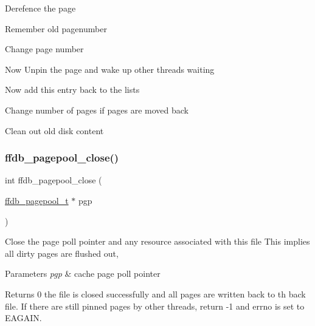 Derefence the page

Remember old pagenumber

Change page number

Now Unpin the page and wake up other threads waiting

Now add this entry back to the lists

Change number of pages if pages are moved back

Clean out old disk content\mbox{\label{adat-devel_2other__libs_2filedb_2filehash_2ffdb__pagepool_8c_a73c44ef71020216252a28a384316dd93}} 
\subsubsection{\texorpdfstring{ffdb\_pagepool\_close()}{ffdb\_pagepool\_close()}}
{\footnotesize\ttfamily int ffdb\+\_\+pagepool\+\_\+close (\begin{DoxyParamCaption}\item[{\mbox{\hyperlink{adat-devel_2other__libs_2filedb_2filehash_2ffdb__pagepool_8h_a73290f737b0e5f8be90a0fa96ddf6ab6}{ffdb\+\_\+pagepool\+\_\+t}} $\ast$}]{pgp }\end{DoxyParamCaption})}

Close the page poll pointer and any resource associated with this file This implies all dirty pages are flushed out,


\begin{DoxyParams}{Parameters}
{\em pgp} & cache page poll pointer \\
\hline
\end{DoxyParams}
\begin{DoxyReturn}{Returns}
0 the file is closed successfully and all pages are written back to th back file. If there are still pinned pages by other threads, return -\/1 and errno is set to E\+A\+G\+A\+IN. 
\end{DoxyReturn}
\mbox{\label{adat-devel_2other__libs_2filedb_2filehash_2ffdb__pagepool_8c_a07a68c49feb01ff2b1348323e3f90801}} 
